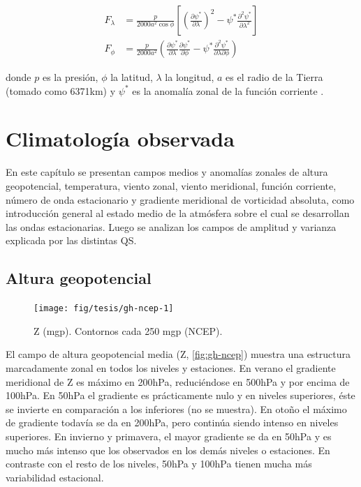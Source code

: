 \documentclass[spanish,a4paper,12pt,oneside]{book}
\begin{document}
\[
\begin{aligned}
F_\lambda &= \frac{p}{2000a^2\cos\phi}\left[ \left( \frac{\partial \psi^*}{\partial \lambda} \right)^2 - \psi^*\frac{\partial^2 \psi^*}{\partial \lambda^2}  \right] \\
F_\phi &= \frac{p}{2000a^2} \left( \frac{\partial \psi^*}{\partial \lambda}\frac{\partial \psi^*}{\partial \phi}  - \psi^* \frac{\partial^2 \psi^*}{\partial \lambda \partial \phi} \right) 
\end{aligned}
\]

donde \(p\) es la presión, \(\phi\) la latitud, \(\lambda\) la longitud,
\(a\) es el radio de la Tierra (tomado como 6371km) y \(\psi^*\) es la
anomalía zonal de la función corriente \citep{Vera2004}.

\chapter{Climatología observada}\label{climatologia-observada}

En este capítulo se presentan campos medios y anomalías zonales de
altura geopotencial, temperatura, viento zonal, viento meridional,
función corriente, número de onda estacionario y gradiente meridional de
vorticidad absoluta, como introducción general al estado medio de la
atmósfera sobre el cual se desarrollan las ondas estacionarias. Luego se
analizan los campos de amplitud y varianza explicada por las distintas
QS.

\section{Altura geopotencial}\label{altura-geopotencial}

\begin{landscape}\begin{figure}

{\centering \texttt{[image: fig/tesis/gh-ncep-1]} 

}

\caption{Z (mgp). Contornos cada 250 mgp (NCEP).}\label{fig:gh-ncep}
\end{figure}
\end{landscape}

El campo de altura geopotencial media (Z, \autoref{fig:gh-ncep}) muestra
una estructura marcadamente zonal en todos los niveles y estaciones. En
verano el gradiente meridional de Z es máximo en 200hPa, reduciéndose en
500hPa y por encima de 100hPa. En 50hPa el gradiente es prácticamente
nulo y en niveles superiores, éste se invierte en comparación a los
inferiores (no se muestra). En otoño el máximo de gradiente todavía se
da en 200hPa, pero continúa siendo intenso en niveles superiores. En
invierno y primavera, el mayor gradiente se da en 50hPa y es mucho más
intenso que los observados en los demás niveles o estaciones. En
contraste con el resto de los niveles, 50hPa y 100hPa tienen mucha más
variabilidad estacional.
\end{document}
